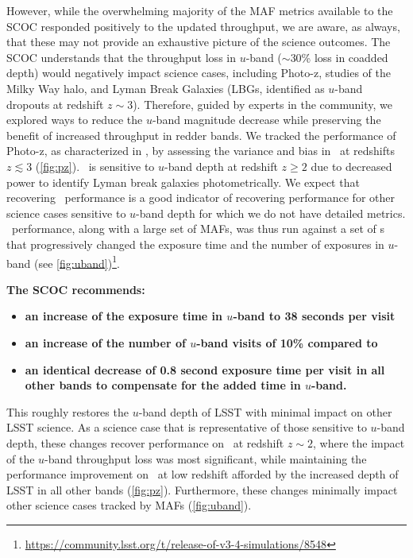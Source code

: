 However, while the overwhelming majority of the MAF metrics available to the SCOC responded positively to the updated throughput, we are aware, as always, that these may not provide an exhaustive picture of the science outcomes. The SCOC understands that the throughput loss in $u$-band (\mbox{$\sim$30\%}  loss in coadded depth) would negatively impact science cases, including Photo-z, studies of the Milky Way halo, and Lyman Break Galaxies (LBGs, identified as $u$-band dropouts at redshift $z\sim3$). Therefore, guided by experts in the community, we explored ways to reduce the $u$-band magnitude decrease while preserving the benefit of increased throughput in redder bands. 
We tracked the performance of Photo-z, as characterized in \citealt{Graham_2017}, by assessing the variance and bias in \pz\ at redshifts $z\lesssim{3}$ (\autoref{fig:pz}). \pz\ is sensitive to $u$-band depth at redshift $z\geq 2$ due to decreased power to identify Lyman break galaxies photometrically. We expect that recovering \pz\ performance is a good indicator of recovering performance for other science cases sensitive to $u$-band depth for which we do not have detailed metrics. \pz\ performance, along with a large set of MAFs, was thus run against a set of \opsim s  that progressively changed the exposure time and the number of exposures in $u$-band (see \autoref{fig:uband})\footnote{\url{https://community.lsst.org/t/release-of-v3-4-simulations/8548}}. 

{\bf The SCOC recommends:} 

\begin{itemize} 
\item {\bf an increase of the exposure time in $u$-band to 38 seconds per visit}
\item {\bf an increase of the number of $u$-band visits of 10\% compared to }
\item {\bf an identical decrease of 0.8 second exposure time per visit in all other bands to compensate for the added time in $u$-band.} 
\end{itemize}


This roughly restores the $u$-band depth of LSST  with minimal impact on other LSST science. As a science case that is representative of those sensitive to $u$-band depth, these changes recover performance on \pz\ at redshift $z\sim2$, where the impact of the $u$-band throughput loss was most significant, while maintaining the performance improvement on \pz\ at low redshift afforded by the increased depth of LSST in all other bands (\autoref{fig:pz}). Furthermore, these changes minimally impact other science cases tracked by MAFs (\autoref{fig:uband}). 

